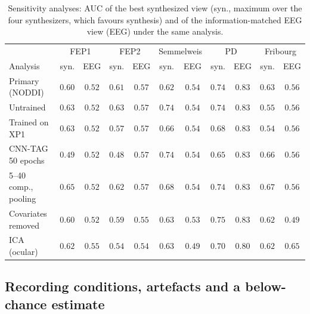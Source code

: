 \begin{table}[!htbp]
    \centering
    \caption{Sensitivity analyses: AUC of the best synthesized view (syn., maximum over the four synthesizers, which favours synthesis) and of the information-matched EEG view (EEG) under the same analysis.}
    \label{tab:sens}
    \scriptsize\setlength{\tabcolsep}{2.5pt}
    \begin{tabular}{@{}l cc cc cc cc cc@{}}
        \hline
        & \multicolumn{2}{c}{FEP1} & \multicolumn{2}{c}{FEP2} & \multicolumn{2}{c}{Semmelweis} & \multicolumn{2}{c}{PD} & \multicolumn{2}{c}{Fribourg} \\
        Analysis & syn. & EEG & syn. & EEG & syn. & EEG & syn. & EEG & syn. & EEG \\
        \hline
        Primary (NODDI) & $0.60$ & $0.52$ & $0.61$ & $0.57$ & $0.62$ & $0.54$ & $0.74$ & $0.83$ & $0.63$ & $0.56$ \\
        Untrained & $0.63$ & $0.52$ & $0.63$ & $0.57$ & $0.74$ & $0.54$ & $0.74$ & $0.83$ & $0.55$ & $0.56$ \\
        Trained on XP1 & $0.63$ & $0.52$ & $0.57$ & $0.57$ & $0.66$ & $0.54$ & $0.68$ & $0.83$ & $0.54$ & $0.56$ \\
        CNN-TAG 50 epochs & $0.49$ & $0.52$ & $0.48$ & $0.57$ & $0.74$ & $0.54$ & $0.65$ & $0.83$ & $0.66$ & $0.56$ \\
        5--40 comp., pooling & $0.65$ & $0.52$ & $0.62$ & $0.57$ & $0.68$ & $0.54$ & $0.74$ & $0.83$ & $0.67$ & $0.56$ \\
        Covariates removed & $0.60$ & $0.52$ & $0.59$ & $0.55$ & $0.63$ & $0.53$ & $0.75$ & $0.83$ & $0.62$ & $0.49$ \\
        ICA (ocular) & $0.62$ & $0.55$ & $0.54$ & $0.54$ & $0.63$ & $0.49$ & $0.70$ & $0.80$ & $0.62$ & $0.65$ \\
        \hline
    \end{tabular}
\end{table}

\subsection{Recording conditions, artefacts and a below-chance estimate}\label{section:res_checks}

